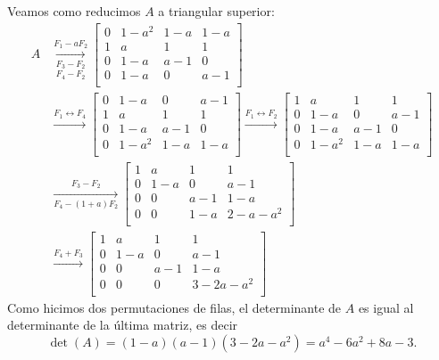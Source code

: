 \begin{enumerate}[topsep=6pt,itemsep=.4cm]
            Veamos como reducimos $A$ a triangular superior:
            \begin{align*}
                A &\underset{F_4 -F_2}{\underset{F_3 -F_2}{\stackrel{F_1-aF_2}{\longrightarrow}}}   
                \begin{bmatrix}
                    0&1-a^2&1-a&1-a \\ 
                    1&a&1&1 \\
                    0&1-a&a-1&0 \\
                    0&1-a&0&a-1 \\
                \end{bmatrix} \\
                &{\stackrel{F_1 \leftrightarrow F_4}{\longrightarrow}} 
                \begin{bmatrix}
                    0&1-a&0&a-1 \\
                    1&a&1&1 \\
                    0&1-a&a-1&0 \\
                    0&1-a^2&1-a&1-a \\ 
                \end{bmatrix} 
                {\stackrel{F_1 \leftrightarrow F_2}{\longrightarrow}}
                \begin{bmatrix}
                    1&a&1&1 \\
                    0&1-a&0&a-1 \\
                    0&1-a&a-1&0 \\
                    0&1-a^2&1-a&1-a \\ 
                \end{bmatrix} \\
                &{\underset{F_4 -(1+a)F_2}{\stackrel{F_3-F_2}{\longrightarrow}}}
                \begin{bmatrix}
                    1&a&1&1 \\
                    0&1-a&0&a-1 \\
                    0&0&a-1&1-a \\
                    0&0&1-a&2-a-a^2 \\ 
                \end{bmatrix}  \\
                &\stackrel{F_4 + F_3}{\longrightarrow}
                \begin{bmatrix}
                    1&a&1&1 \\
                    0&1-a&0&a-1 \\
                    0&0&a-1&1-a \\
                    0&0&0&3-2a-a^2 \\ 
                \end{bmatrix} 
            \end{align*}
        Como 
         hicimos dos permutaciones de filas, el determinante de  $A$ es igual al determinante de la última matriz,  es decir
        $$
        \det(A) = (1-a)(a-1)(3-2a-a^2) = a^4 - 6 a^2 + 8 a - 3.
        $$
        

\end{enumerate}
